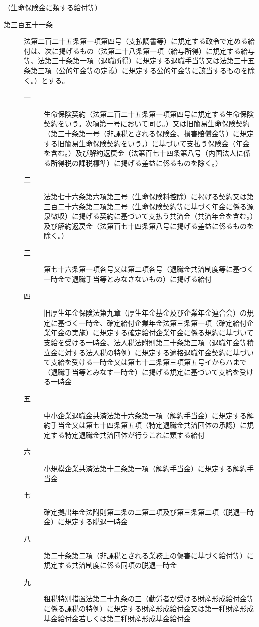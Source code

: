\documentclass[twocolumn,a4j,10pt]{ltjtarticle}
\begin{document}
\noindent\hspace{10pt}（生命保険金に類する給付等）
\begin{description}
\item[第三百五十一条]法第二百二十五条第一項第四号（支払調書等）に規定する政令で定める給付は、次に掲げるもの（法第二十八条第一項（給与所得）に規定する給与等、法第三十条第一項（退職所得）に規定する退職手当等又は法第三十五条第三項（公的年金等の定義）に規定する公的年金等に該当するものを除く。）とする。
\begin{description}
\item[一]生命保険契約（法第二百二十五条第一項第四号に規定する生命保険契約をいう。次項第一号において同じ。）又は旧簡易生命保険契約（第三十条第一号（非課税とされる保険金、損害賠償金等）に規定する旧簡易生命保険契約をいう。）に基づいて支払う保険金（年金を含む。）及び解約返戻金（法第百七十四条第八号（内国法人に係る所得税の課税標準）に掲げる差益に係るものを除く。）
\item[二]法第七十六条第六項第三号（生命保険料控除）に掲げる契約又は第三百二十六条第二項第二号（生命保険契約等に基づく年金に係る源泉徴収）に掲げる契約に基づいて支払う共済金（共済年金を含む。）及び解約返戻金（法第百七十四条第八号に掲げる差益に係るものを除く。）
\item[三]第七十六条第一項各号又は第二項各号（退職金共済制度等に基づく一時金で退職手当等とみなさないもの）に掲げる給付
\item[四]旧厚生年金保険法第九章（厚生年金基金及び企業年金連合会）の規定に基づく一時金、確定給付企業年金法第三条第一項（確定給付企業年金の実施）に規定する確定給付企業年金に係る規約に基づいて支給を受ける一時金、法人税法附則第二十条第三項（退職年金等積立金に対する法人税の特例）に規定する適格退職年金契約に基づいて支給を受ける一時金又は第七十二条第三項第五号イからハまで（退職手当等とみなす一時金）に掲げる規定に基づいて支給を受ける一時金
\item[五]中小企業退職金共済法第十六条第一項（解約手当金）に規定する解約手当金又は第七十四条第五項（特定退職金共済団体の承認）に規定する特定退職金共済団体が行うこれに類する給付
\item[六]小規模企業共済法第十二条第一項（解約手当金）に規定する解約手当金
\item[七]確定拠出年金法附則第二条の二第二項及び第三条第二項（脱退一時金）に規定する脱退一時金
\item[八]第二十条第二項（非課税とされる業務上の傷害に基づく給付等）に規定する共済制度に係る同項の脱退一時金
\item[九]租税特別措置法第二十九条の三（勤労者が受ける財産形成給付金等に係る課税の特例）に規定する財産形成給付金又は第一種財産形成基金給付金若しくは第二種財産形成基金給付金

\end{description}
\end{description}
\end{document}
